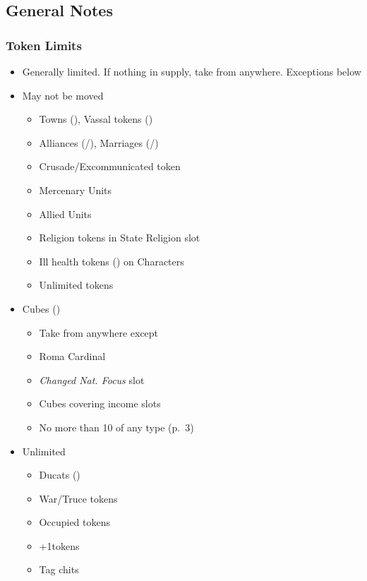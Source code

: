 \documentclass[10pt]{article}
\begin{document}
\addbackground
\addfooter


\subsection*{General Notes }
\subsubsection*{Token Limits}
\begin{itemize}
	\item Generally limited. If nothing in supply, take from anywhere. Exceptions below
	\item May not be moved
	\begin{itemize}
		\item Towns (\town), Vassal tokens (\vassal)
		\item Alliances (\alliance/\activeally), Marriages (\marriage/\disputedsuccession)
		\item Crusade/Excommunicated token
		\item Mercenary Units
		\item Allied Units
		\item Religion tokens in State Religion slot
		\item Ill health tokens (\illhealth) on Characters
		\item \dprime Unlimited\dprime\xspace tokens
	\end{itemize}
	\item Cubes (\cube)
	\begin{itemize}
		\item Take from anywhere except
		\item Roma Cardinal
		\item \emph{Changed Nat. Focus} slot
		\item Cubes covering income slots
		\item No more than 10 \monarchpower of any type (p.~3)
	\end{itemize}
	\item Unlimited
	\begin{itemize}
		\item Ducats (\ducats)
		\item War/Truce tokens
		\item Occupied tokens
		\item +1\manpower tokens
		\item Tag chits
	\end{itemize}
\end{itemize}
\end{document}
